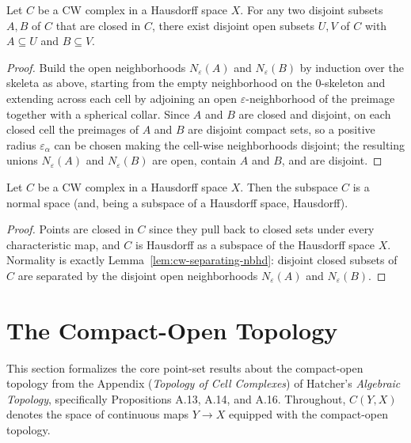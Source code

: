 \begin{lemma}
    \label{lem:cw-separating-nbhd}
    Let $C$ be a CW complex in a Hausdorff space $X$. For any two disjoint
    subsets $A, B$ of $C$ that are closed in $C$, there exist disjoint open
    subsets $U, V$ of $C$ with $A \subseteq U$ and $B \subseteq V$.
\end{lemma}
\begin{proof}
    Build the open neighborhoods $N_\varepsilon(A)$ and $N_\varepsilon(B)$ by
    induction over the skeleta as above, starting from the empty neighborhood on
    the $0$-skeleton and extending across each cell by adjoining an open
    $\varepsilon$-neighborhood of the preimage together with a spherical collar.
    Since $A$ and $B$ are closed and disjoint, on each closed cell the preimages
    of $A$ and $B$ are disjoint compact sets, so a positive radius
    $\varepsilon_\alpha$ can be chosen making the cell-wise neighborhoods
    disjoint; the resulting unions $N_\varepsilon(A)$ and $N_\varepsilon(B)$ are
    open, contain $A$ and $B$, and are disjoint.
\end{proof}

\begin{proposition}
    \label{prop:cw-normal}
    Let $C$ be a CW complex in a Hausdorff space $X$. Then the subspace $C$ is a
    normal space (and, being a subspace of a Hausdorff space, Hausdorff).
\end{proposition}
\begin{proof}
    Points are closed in $C$ since they pull back to closed sets under every
    characteristic map, and $C$ is Hausdorff as a subspace of the Hausdorff space
    $X$. Normality is exactly
    Lemma~\ref{lem:cw-separating-nbhd}: disjoint closed subsets of $C$ are
    separated by the disjoint open neighborhoods $N_\varepsilon(A)$ and
    $N_\varepsilon(B)$.
\end{proof}

\section{The Compact-Open Topology}

This section formalizes the core point-set results about the compact-open
topology from the Appendix (\emph{Topology of Cell Complexes}) of Hatcher's
\emph{Algebraic Topology}, specifically Propositions A.13, A.14, and A.16.
Throughout, $C(Y, X)$ denotes the space of continuous maps $Y \to X$ equipped
with the compact-open topology.

